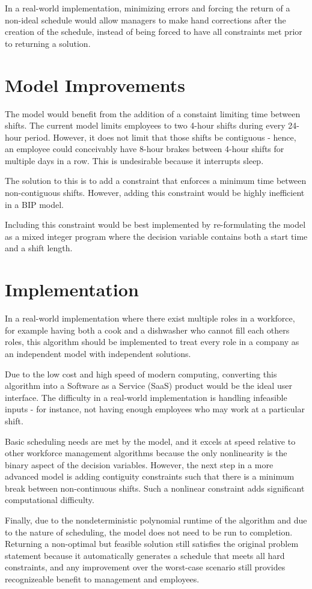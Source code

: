 In a real-world implementation, minimizing errors and forcing the return of a non-ideal schedule would allow managers to make hand corrections after the creation of the schedule, instead of being forced to have all constraints met prior to returning a solution. 

\section{Model Improvements}

The model would benefit from the addition of a constaint limiting time between shifts. The current model limits employees to two 4-hour shifts during every 24-hour period. However, it does not limit that those shifts be contiguous - hence, an employee could conceivably have 8-hour brakes between 4-hour shifts for multiple days in a row. This is undesirable because it interrupts sleep.

The solution to this is to add a constraint that enforces a minimum time between non-contiguous shifts. However, adding this constraint would be highly inefficient in a BIP model. 

Including this constraint would be best implemented by re-formulating the model as a mixed integer program where the decision variable contains both a start time and a shift length. 

\section{Implementation}

In a real-world implementation where there exist multiple roles in a workforce, for example having both a cook and a dishwasher who cannot fill each others roles, this algorithm should be implemented to treat every role in a company as an independent model with independent solutions. 

Due to the low cost and high speed of modern computing, converting this algorithm into a Software as a Service (SaaS) product would be the ideal user interface. The difficulty in a real-world implementation is handling infeasible inputs - for instance, not having enough employees who may work at a particular shift.

Basic scheduling needs are met by the model, and it excels at speed relative to other workforce management algorithms because the only nonlinearity is the binary aspect of the decision variables. However, the next step in a more advanced model is adding contiguity constraints such that there is a minimum break between non-continuous shifts. Such a nonlinear constraint adds significant computational difficulty.

Finally, due to the nondeterministic polynomial runtime of the algorithm and due to the nature of scheduling, the model does not need to be run to completion. Returning a non-optimal but feasible solution still satisfies the original problem statement because it automatically generates a schedule that meets all hard constraints, and any improvement over the worst-case scenario still provides recognizeable benefit to management and employees.


